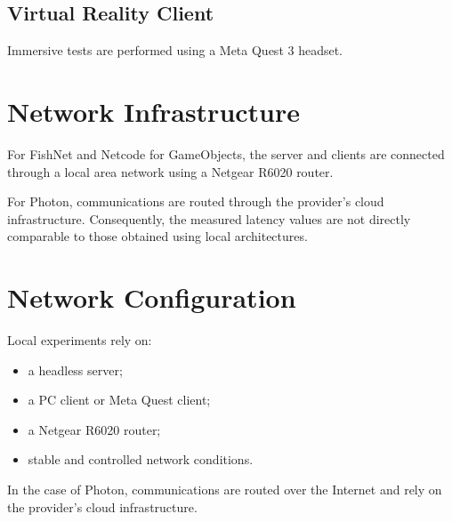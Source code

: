 \documentclass[11pt,a4paper]{article}
\begin{document}
\subsection{Virtual Reality Client}

Immersive tests are performed using a Meta Quest 3 headset.

\section{Network Infrastructure}

For FishNet and Netcode for GameObjects, the server and clients are connected through a local area network using a Netgear R6020 router.

For Photon, communications are routed through the provider's cloud infrastructure. Consequently, the measured latency values are not directly comparable to those obtained using local architectures.

\section{Network Configuration}

Local experiments rely on:

\begin{itemize}
\item a headless server;
\item a PC client or Meta Quest client;
\item a Netgear R6020 router;
\item stable and controlled network conditions.
\end{itemize}

In the case of Photon, communications are routed over the Internet and rely on the provider's cloud infrastructure.
\end{document}
